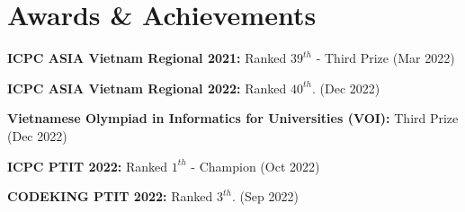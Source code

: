 \documentclass[letterpaper,11pt]{article}
\newcommand{\resumeSubHeadingListStart}{\begin{itemize}[leftmargin=0.15in, label={}]}
\newcommand{\resumeSubHeadingListEnd}{\end{itemize}}
\begin{document}










        





\section{Awards \& Achievements}
\vspace{2pt}
\resumeSubHeadingListStart
  \small{\item{
      \textbf{ICPC ASIA Vietnam Regional 2021:}{ Ranked $39^{th}$ - Third Prize (Mar 2022)} \\ \vspace{3pt}

      \textbf{ICPC ASIA Vietnam Regional 2022:}{ Ranked $40^{th}$. (Dec 2022)} \\ \vspace{3pt}

      \textbf{Vietnamese Olympiad in Informatics for Universities (VOI):}{ Third Prize (Dec 2022)} \\ \vspace{3pt}

      \textbf{ICPC PTIT 2022:}{ Ranked $1^{th}$ - Champion (Oct 2022)} \\ \vspace{3pt}

      \textbf{CODEKING PTIT 2022:}{ Ranked $3^{th}$. (Sep 2022)} \\ \vspace{3pt}
    

}}
\resumeSubHeadingListEnd
\end{document}
